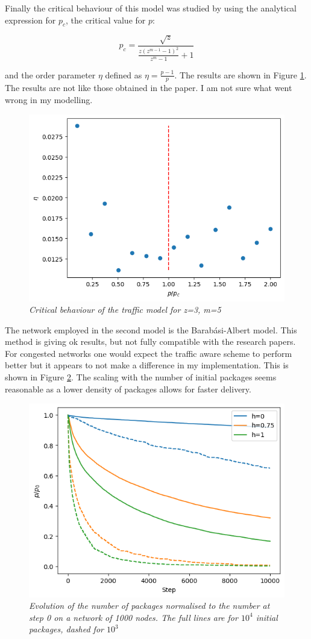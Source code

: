 Finally the critical behaviour of this model was studied by using the analytical expression for $p_c$, the critical value for $p$:

\begin{equation}
    p_c = \frac{\sqrt{z}}{\frac{z(z^{m-1} - 1)^2}{z^m - 1} + 1}
\end{equation}

and the order parameter $\eta$ defined as $\eta = \frac{p-1}{p}$. The results are shown in Figure \ref{crit}. The results are not like those obtained in the paper. I am not sure what went wrong in my modelling.

\begin{figure}[H]
    \centering
    \includegraphics[width=0.5\linewidth]{images/critical_behaviour.png}
    \caption{\textit{Critical behaviour of the traffic model for z=3, m=5}}
    \label{crit}
\end{figure}

The network employed in the second model is the Barabási-Albert model. This method is giving ok results, but not fully compatible with the research papers. For congested networks one would expect the traffic aware scheme to perform better but it appears to not make a difference in my implementation. This is shown in Figure \ref{method2_evol}. The scaling with the number of initial packages seems reasonable as a lower density of packages allows for faster delivery.

\begin{figure}[H]
    \centering
    \includegraphics[width=0.5\linewidth]{images/method2_evol.png}
    \caption{\textit{Evolution of the number of packages normalised to the number at step 0 on a network of 1000 nodes. The full lines are for $10^4$ initial packages, dashed for $10^3$}}
    \label{method2_evol}
\end{figure}


